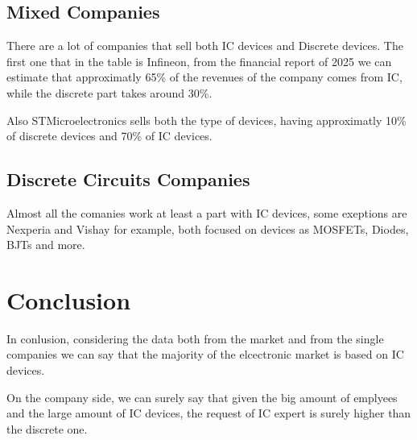 \documentclass[twocolumn]{article}
\begin{document}
\subsection{Mixed Companies}
There are a lot of companies that sell both IC devices and Discrete devices. The first one that in the table is Infineon, from the financial report of 2025 we can estimate that approximatly 65\% of the revenues of the company comes from IC, while the discrete part takes around 30\%. \cite{infineon2025annual}

Also STMicroelectronics sells both the type of devices, having approximatly 10\% of discrete devices and 70\% of IC devices. \cite{stm2025annual}

\subsection{Discrete Circuits Companies}
Almost all the comanies work at least a part with IC devices, some exeptions are Nexperia and Vishay for example, both focused on devices as MOSFETs, Diodes, BJTs and more.

\section{Conclusion}
In conlusion, considering the data both from the market and from the single companies we can say that the majority of the elcectronic market is based on IC devices.

On the company side, we can surely say that given the big amount of emplyees and the large amount of IC devices, the request of IC expert is surely higher than the discrete one.


\end{document}
